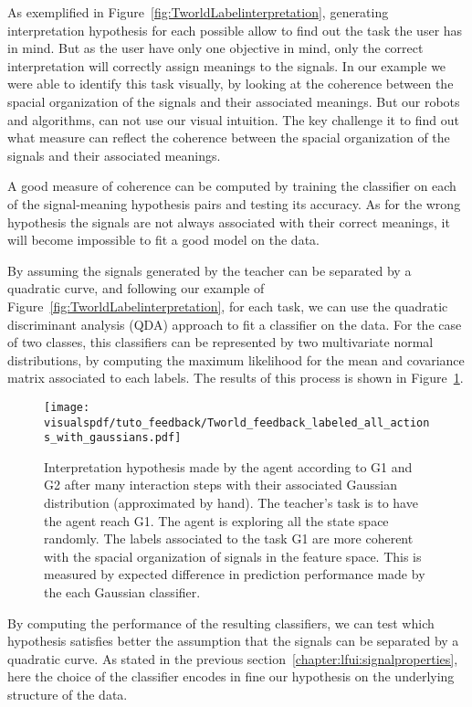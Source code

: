 As exemplified in Figure~\ref{fig:TworldLabelinterpretation}, generating interpretation hypothesis for each possible allow to find out the task the user has in mind. But as the user have only one objective in mind, only the correct interpretation will correctly assign meanings to the signals. In our example we were able to identify this task visually, by looking at the coherence between the spacial organization of the signals and their associated meanings. But our robots and algorithms, can not use our visual intuition. The key challenge it to find out what measure can reflect the coherence between the spacial organization of the signals and their associated meanings.

A good measure of coherence can be computed by training the classifier on each of the signal-meaning hypothesis pairs and testing its accuracy. As for the wrong hypothesis the signals are not always associated with their correct meanings, it will become impossible to fit a good model on the data. 

By assuming the signals generated by the teacher can be separated by a quadratic curve, and following our example of Figure~\ref{fig:TworldLabelinterpretation}, for each task, we can use the  quadratic discriminant analysis (QDA) \cite{lachenbruch1975discriminant} approach to fit a classifier on the data. For the case of two classes, this classifiers can be represented by two multivariate normal distributions, by  computing the maximum likelihood for the mean and covariance matrix associated to each labels. The results of this process is shown in Figure~\ref{fig:TworldLabelGaussian}.

\begin{figure}[!htbp]
    \centering
    \texttt{[image: \\visualspdf/tuto\_feedback/Tworld\_feedback\_labeled\_all\_actions\_with\_gaussians.pdf]}
    \caption{Interpretation hypothesis made by the agent according to G1 and G2 after many interaction steps with their associated Gaussian distribution (approximated by hand). The teacher's task is to have the agent reach G1. The agent is exploring all the state space randomly. The labels associated to the task G1 are more coherent with the spacial organization of signals in the feature space. This is measured by expected difference in prediction performance made by the each Gaussian classifier.}
    \label{fig:TworldLabelGaussian}
\end{figure}

By computing the performance of the resulting classifiers, we can test which hypothesis satisfies better the assumption that the signals can be separated by a quadratic curve. As stated in the previous section~\ref{chapter:lfui:signalproperties}, here the choice of the classifier encodes in fine our hypothesis on the underlying structure of the data.

